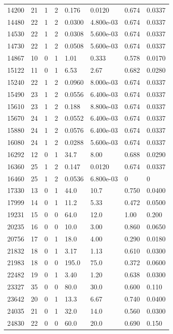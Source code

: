 \documentclass[preview]{standalone}
\begin{document}
{{{\begin{tabular}{L{1.2cm}C{1.2cm} C{0.3cm}C{0.5cm} C{1.4cm}C{1.4cm} C{1.4cm}C{1.4cm}}
  14200  &    21  & 1     &  2 &  0.176  & 0.0120  & 0.674 &  0.0337   \\ 
  14480  &    22  & 1     &  2 &  0.0300  & 4.800e-03  & 0.674 &  0.0337   \\ 
  14530  &    22  & 1     &  2 &  0.0308  & 5.600e-03  & 0.674 &  0.0337   \\ 
  14730  &    22  & 1     &  2 &  0.0508  & 5.600e-03  & 0.674 &  0.0337   \\ 
  14867  &    10  & 0     &  1 &  1.01  & 0.333  & 0.578 &  0.0170   \\ 
  15122  &    11  & 0     &  1 &  6.53  & 2.67  & 0.682 &  0.0280   \\ 
  15240  &    22  & 1     &  2 &  0.0960  & 8.000e-03  & 0.674 &  0.0337   \\ 
  15490  &    23  & 1     &  2 &  0.0556  & 6.400e-03  & 0.674 &  0.0337   \\ 
  15610  &    23  & 1     &  2 &  0.188  & 8.800e-03  & 0.674 &  0.0337   \\ 
  15670  &    24  & 1     &  2 &  0.0552  & 6.400e-03  & 0.674 &  0.0337   \\ 
  15880  &    24  & 1     &  2 &  0.0576  & 6.400e-03  & 0.674 &  0.0337   \\ 
  16080  &    24  & 1     &  2 &  0.0288  & 5.600e-03  & 0.674 &  0.0337   \\ 
  16292  &    12  & 0     &  1 &  34.7  & 8.00  & 0.688 &  0.0290   \\ 
  16360  &    25  & 1     &  2 &  0.147  & 0.0120  & 0.674 &  0.0337   \\ 
  16460  &    25  & 1     &  2 &  0.0536  & 6.800e-03  & 0 &  0   \\ 
  17330  &    13  & 0     &  1 &  44.0  & 10.7  & 0.750 &  0.0400   \\ 
  17999  &    14  & 0     &  1 &  11.2  & 5.33  & 0.472 &  0.0500   \\ 
  19231  &    15  & 0     &  0 &  64.0  & 12.0  & 1.00 &  0.200   \\ 
  20235  &    16  & 0     &  0 &  10.0  & 3.00  & 0.860 &  0.0650   \\ 
  20756  &    17  & 0     &  1 &  18.0  & 4.00  & 0.290 &  0.0180   \\ 
  21832  &    18  & 0     &  1 &  3.17  & 1.13  & 0.610 &  0.0300   \\ 
  21983  &    18  & 0     &  0 &  195.0  & 75.0  & 0.372 &  0.0600   \\ 
  22482  &    19  & 0     &  1 &  3.40  & 1.20  & 0.638 &  0.0300   \\ 
  23327  &    35  & 0     &  0 &  80.0  & 30.0  & 0.600 &  0.110   \\ 
  23642  &    20  & 0     &  1 &  13.3  & 6.67  & 0.740 &  0.0400   \\ 
  24035  &    21  & 0     &  1 &  32.0  & 14.0  & 0.560 &  0.0300   \\ 
  24830  &    22  & 0     &  0 &  60.0  & 20.0  & 0.690 &  0.150   \\ 
\hline 
\end{tabular} 

}}}
\end{document}

